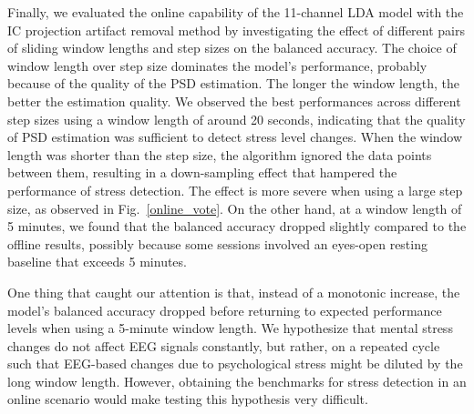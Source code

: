 \documentclass[journal]{IEEEtran}
\begin{document}

\par
Finally, we evaluated the online capability of the 11-channel LDA model with the IC projection artifact removal method by investigating the effect of different pairs of sliding window lengths and step sizes on the balanced accuracy.
The choice of window length over step size dominates the model's performance, probably because of the quality of the PSD estimation.
The longer the window length, the better the estimation quality.
We observed the best performances across different step sizes using a window length of around 20 seconds, indicating that the quality of PSD estimation was sufficient to detect stress level changes.
When the window length was shorter than the step size, the algorithm ignored the data points between them, resulting in a down-sampling effect that hampered the performance of stress detection.
The effect is more severe when using a large step size, as observed in Fig.~\ref{online_vote}.
On the other hand, at a window length of 5 minutes, we found that the balanced accuracy dropped slightly compared to the offline results, possibly because some sessions involved an eyes-open resting baseline that exceeds 5 minutes. 
\par
One thing that caught our attention is that, instead of a monotonic increase, the model's balanced accuracy dropped before returning to expected performance levels when using a 5-minute window length.
We hypothesize that mental stress changes do not affect EEG signals constantly, but rather, on a repeated cycle such that EEG-based changes due to psychological stress might be diluted by the long window length.
However, obtaining the benchmarks for stress detection in an online scenario would make testing this hypothesis very difficult.
\end{document}
